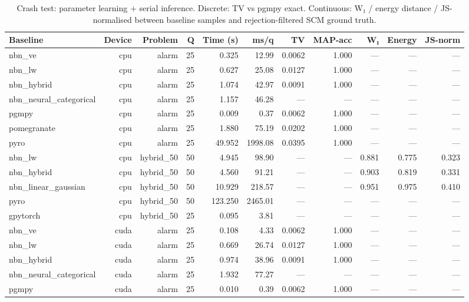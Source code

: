 \begin{table}[h]
  \centering
  \caption{Crash test: parameter learning + serial inference. Discrete: TV vs pgmpy exact. Continuous: W₁ / energy distance / JS-normalised between baseline samples and rejection-filtered SCM ground truth.}
  \label{tab:nbn-crash-test}
  \begin{tabular}{lrrrrrrrrrr}
    \toprule
    Baseline & Device & Problem & Q & Time (s) & ms/q & TV & MAP-acc & W₁ & Energy & JS-norm \\
    \midrule
    nbn\_ve & cpu & alarm & 25 & 0.325 & 12.99 & 0.0062 & 1.000 & — & — & — \\
    nbn\_lw & cpu & alarm & 25 & 0.627 & 25.08 & 0.0127 & 1.000 & — & — & — \\
    nbn\_hybrid & cpu & alarm & 25 & 1.074 & 42.97 & 0.0091 & 1.000 & — & — & — \\
    nbn\_neural\_categorical & cpu & alarm & 25 & 1.157 & 46.28 & — & — & — & — & — \\
    pgmpy & cpu & alarm & 25 & 0.009 & 0.37 & 0.0062 & 1.000 & — & — & — \\
    pomegranate & cpu & alarm & 25 & 1.880 & 75.19 & 0.0202 & 1.000 & — & — & — \\
    pyro & cpu & alarm & 25 & 49.952 & 1998.08 & 0.0395 & 1.000 & — & — & — \\
    nbn\_lw & cpu & hybrid\_50 & 50 & 4.945 & 98.90 & — & — & 0.881 & 0.775 & 0.323 \\
    nbn\_hybrid & cpu & hybrid\_50 & 50 & 4.560 & 91.21 & — & — & 0.903 & 0.819 & 0.331 \\
    nbn\_linear\_gaussian & cpu & hybrid\_50 & 50 & 10.929 & 218.57 & — & — & 0.951 & 0.975 & 0.410 \\
    pyro & cpu & hybrid\_50 & 50 & 123.250 & 2465.01 & — & — & — & — & — \\
    gpytorch & cpu & hybrid\_50 & 25 & 0.095 & 3.81 & — & — & — & — & — \\
    nbn\_ve & cuda & alarm & 25 & 0.108 & 4.33 & 0.0062 & 1.000 & — & — & — \\
    nbn\_lw & cuda & alarm & 25 & 0.669 & 26.74 & 0.0127 & 1.000 & — & — & — \\
    nbn\_hybrid & cuda & alarm & 25 & 0.974 & 38.96 & 0.0091 & 1.000 & — & — & — \\
    nbn\_neural\_categorical & cuda & alarm & 25 & 1.932 & 77.27 & — & — & — & — & — \\
    pgmpy & cuda & alarm & 25 & 0.010 & 0.39 & 0.0062 & 1.000 & — & — & — \\

\end{tabular}
\end{table}
